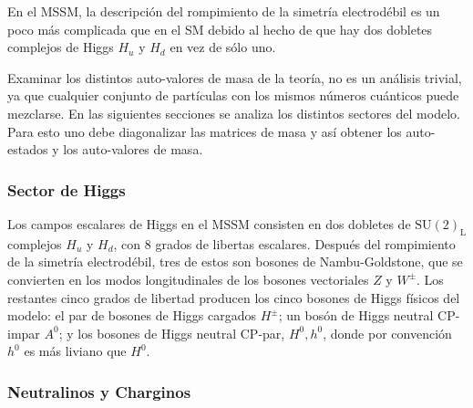 En el MSSM, la descripción del rompimiento de la simetría electrodébil es un
poco más complicada que en el SM debido al hecho de que hay dos dobletes
complejos de Higgs $H_u$ y $H_d$ en vez de sólo uno.





Examinar los distintos auto-valores de masa de la teoría, no es un análisis
trivial, ya que cualquier conjunto de partículas con los mismos números
cuánticos puede mezclarse. En las siguientes secciones se analiza los distintos
sectores del modelo. Para esto uno debe diagonalizar las matrices de masa y así
obtener los auto-estados y los auto-valores de masa.


\subsubsection{Sector de Higgs}

Los campos escalares de Higgs en el MSSM consisten en dos dobletes de
$\text{SU}(2)_\text{L}$ complejos $H_u$ y $H_d$, con 8 grados de libertas
escalares. Después del rompimiento de la simetría electrodébil, tres de estos
son bosones de Nambu-Goldstone, que se convierten en los modos longitudinales de
los bosones vectoriales $Z$ y $W^\pm$. Los restantes cinco grados de libertad
producen los cinco bosones de Higgs físicos del modelo: el par de bosones de
Higgs cargados $H^\pm$; un bosón de Higgs neutral CP-impar $A^0$; y los bosones
de Higgs neutral CP-par, $H^0,h^0$, donde por convención $h^0$ es más liviano
que $H^0$.


\subsubsection{Neutralinos y Charginos}\label{sec:mass_NC}


